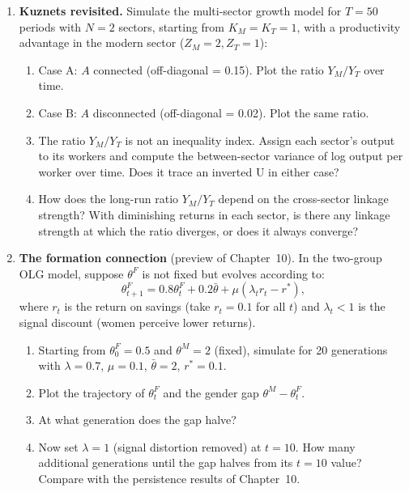 \documentclass[../structural_economics_book.tex]{subfiles}
\begin{document}
\begin{enumerate}[label=\textbf{3.\arabic*}, leftmargin=3em]
\item \textbf{Kuznets revisited.} Simulate the multi-sector growth model for $T = 50$ periods with $N = 2$ sectors, starting from $K_M = K_T = 1$, with a productivity advantage in the modern sector ($Z_M = 2, Z_T = 1$):
\begin{enumerate}
\item Case A: $A$ connected (off-diagonal = 0.15). Plot the ratio $Y_M/Y_T$ over time.
\item Case B: $A$ disconnected (off-diagonal = 0.02). Plot the same ratio.
\item The ratio $Y_M/Y_T$ is not an inequality index. Assign each sector's output to its workers and compute the between-sector variance of log output per worker over time. Does it trace an inverted U in either case?
\item How does the long-run ratio $Y_M/Y_T$ depend on the cross-sector linkage strength? With diminishing returns in each sector, is there any linkage strength at which the ratio diverges, or does it always converge?
\end{enumerate}

\item \textbf{The formation connection} (preview of Chapter~10). In the two-group OLG model, suppose $\theta^F$ is not fixed but evolves according to:
\begin{equation}
\theta^F_{t+1} = 0.8 \theta^F_t + 0.2 \bar{\theta} + \mu(\lambda_t r_t - r^*),
\end{equation}
where $r_t$ is the return on savings (take $r_t = 0.1$ for all $t$) and $\lambda_t < 1$ is the signal discount (women perceive lower returns).
\begin{enumerate}
\item Starting from $\theta^F_0 = 0.5$ and $\theta^M = 2$ (fixed), simulate for 20 generations with $\lambda = 0.7$, $\mu = 0.1$, $\bar{\theta} = 2$, $r^* = 0.1$.
\item Plot the trajectory of $\theta^F_t$ and the gender gap $\theta^M - \theta^F_t$.
\item At what generation does the gap halve?
\item Now set $\lambda = 1$ (signal distortion removed) at $t = 10$. How many additional generations until the gap halves from its $t = 10$ value? Compare with the persistence results of Chapter~10.
\end{enumerate}
\end{enumerate}


\newpage
\end{document}
